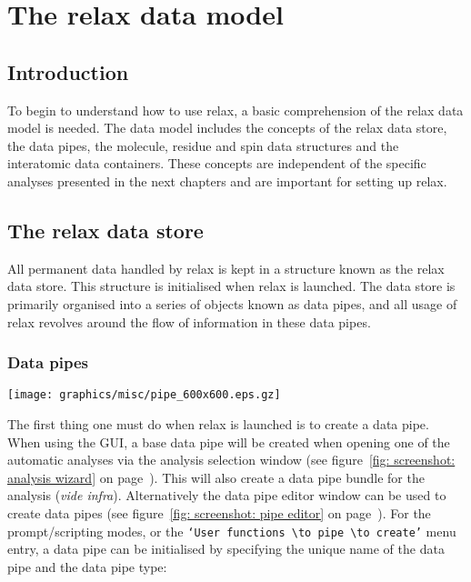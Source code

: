 
\chapter{The relax data model} \label{ch: data model}



\section{Introduction}

To begin to understand how to use relax, a basic comprehension of the relax data model is needed.  The data model includes the concepts of the relax data store, the data pipes, the molecule, residue and spin data structures and the interatomic data containers.  These concepts are independent of the specific analyses presented in the next chapters and are important for setting up relax.




\section{The relax data store}

All permanent data handled by relax is kept in a structure known as the relax data store.  This structure is initialised when relax is launched.  The data store is primarily organised into a series of objects known as data pipes, and all usage of relax revolves around the flow of information in these data pipes.



\subsection{Data pipes}

\begin{figure*}[h]
\texttt{[image: graphics/misc/pipe\_600x600.eps.gz]}
\end{figure*}

The first thing one must do when relax is launched is to create a data pipe.  When using the GUI, a base data pipe will be created when opening one of the automatic analyses via the analysis selection window (see figure~\ref{fig: screenshot: analysis wizard} on page~\pageref{fig: screenshot: analysis wizard}).  This will also create a data pipe bundle for the analysis (\textit{vide infra}).  Alternatively the data pipe editor window can be used to create data pipes (see figure~\ref{fig: screenshot: pipe editor} on page~\pageref{fig: screenshot: pipe editor}).  For the prompt/scripting modes, or the \texttt{`User functions $\to$ pipe $\to$ create'} menu entry, a data pipe can be initialised by specifying the unique name of the data pipe and the data pipe type:

